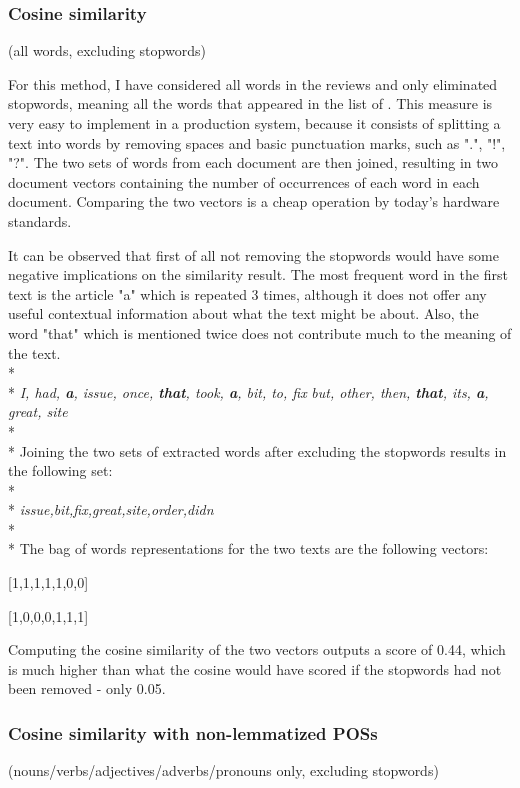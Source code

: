 \subsubsection{Cosine similarity}
(all words, excluding stopwords)

For this method, I have considered all words in the reviews and only eliminated stopwords, meaning all the words that appeared in the list of \citet{SaltonandBuckleyStopWordsAggresive}.
This measure is very easy to implement in a production system, because it consists of splitting a text into words by removing spaces and basic punctuation marks, such as ".", "!", "?". The two sets of words from each document are then joined, resulting in two document vectors containing the number of occurrences of each word in each document. Comparing the two vectors is a cheap operation by today's hardware standards.

It can be observed that first of all not removing the stopwords would have some negative implications on the similarity result. The most frequent word in the first text is the article "a" which is repeated 3 times, although it does not offer any useful contextual information about what the text might be about. Also, the word "that" which is mentioned twice does not contribute much to the meaning of the text. 
\\*
\\*
\textit{I, had, \textbf{a}, issue, once, \textbf{that}, took, \textbf{a}, bit, to, fix}
\textit{but, other, then, \textbf{that}, its, \textbf{a}, great, site}
\\*
\\*
Joining the two sets of extracted words after excluding the stopwords results in the following set:
\\*
\\*
\textit{issue,bit,fix,great,site,order,didn}
\\*
\\*
The bag of words representations for the two texts are the following vectors:

[1,1,1,1,1,0,0]

[1,0,0,0,1,1,1]

Computing the cosine similarity of the two vectors outputs a score of 0.44, which is much higher than what the cosine would have scored if the stopwords had not been removed - only 0.05.

\subsubsection{Cosine similarity with non-lemmatized POSs}
(nouns/verbs/adjectives/adverbs/pronouns only, excluding stopwords)

